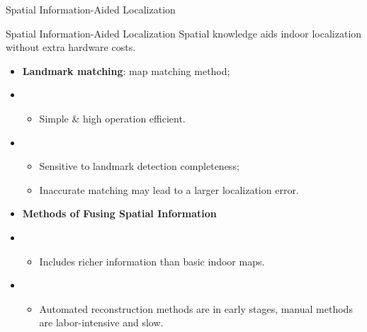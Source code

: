 \begin{frame}{Spatial Information-Aided Localization}

	\begin{block}{Spatial Information-Aided Localization}
		Spatial knowledge aids indoor localization without extra hardware costs.
	\end{block}
	
	\begin{itemize}
		\item \textbf{Landmark matching}: map matching method;
		\item {}
		      \begin{itemize}
			    	\item Simple \& high operation efficient.
		      \end{itemize}
		\item {}
		      \begin{itemize}
			      \item Sensitive to landmark detection completeness;
			      \item Inaccurate matching may lead to a larger localization error.
		      \end{itemize}
		\item \textbf{Methods of Fusing Spatial Information}
		\item {}
		      \begin{itemize}
			      \item Includes richer information than basic indoor maps.
		      \end{itemize}
		\item {}
		      \begin{itemize}
			      \item Automated reconstruction methods are in early stages, manual methods are labor-intensive and slow.
		      \end{itemize}
	\end{itemize}
\end{frame}